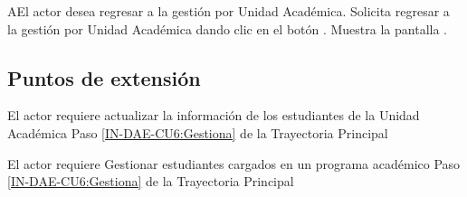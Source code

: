 \begin{UCtrayectoriaA}{A}{El actor desea regresar a la gestión por Unidad Académica.}
	\UCpaso [\UCactor] Solicita regresar a la gestión por Unidad Académica dando clic en el botón .
	\UCpaso Muestra la pantalla .
\end{UCtrayectoriaA}

\subsection{Puntos de extensión}

{El actor requiere actualizar la información de los estudiantes de la Unidad Académica}
{Paso \ref{IN-DAE-CU6:Gestiona} de la Trayectoria Principal}
{}

{El actor requiere Gestionar estudiantes cargados en un programa académico}
{Paso \ref{IN-DAE-CU6:Gestiona} de la Trayectoria Principal}
{}